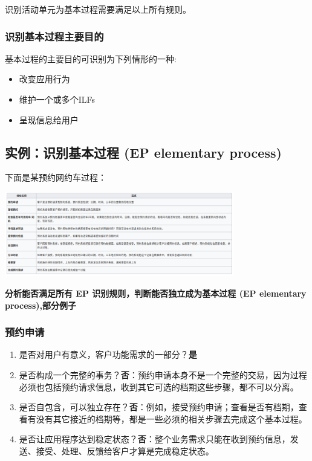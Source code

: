 识别活动单元为基本过程需要满足以上所有规则。\\

\hypertarget{ux8bc6ux522bux57faux672cux8fc7ux7a0bux4e3bux8981ux76eeux7684}{%
\subsubsection{识别基本过程主要目的}\label{ux8bc6ux522bux57faux672cux8fc7ux7a0bux4e3bux8981ux76eeux7684}}

基本过程的主要目的可识别为下列情形的一种:

\begin{itemize}
\tightlist
\item
  改变应用行为
\item
  维护一个或多个ILFs
\item
  呈现信息给用户
\end{itemize}

\hypertarget{ux5b9eux4f8bux8bc6ux522bux57faux672cux8fc7ux7a0b-ep-elementary-process}{%
\subsection{实例：识别基本过程 (EP elementary
process)}\label{ux5b9eux4f8bux8bc6ux522bux57faux672cux8fc7ux7a0b-ep-elementary-process}}

下面是某预约网约车过程：


\includegraphics[width=10cm]{Screenshotfrom20221220203338.png}

\textbf{分析能否满足所有 EP 识别规则，判断能否独立成为基本过程 (EP
elementary process),部分例子}

\hypertarget{ux9884ux7ea6ux7533ux8bf7}{%
\subsubsection{预约申请}\label{ux9884ux7ea6ux7533ux8bf7}}

\begin{enumerate}
\tightlist
\item
  是否对用户有意义，客户功能需求的一部分？\textbf{是}
\item
  是否构成一个完整的事务？\textbf{否}：预约申请本身不是一个完整的交易，因为过程必须也包括预约请求信息，收到其它可选的档期这些步骤，都不可以分离。
\item
  是否自包含，可以独立存在？\textbf{否}：例如，接受预约申请；查看是否有档期，查看有没有其它接近的档期等，都是一些必须的相关步骤去完成这个基本过程。
\item
  是否让应用程序达到稳定状态？\textbf{否}：整个业务需求只能在收到预约信息，发送、接受、处理、反馈给客户才算是完成稳定状态。
\end{enumerate}

